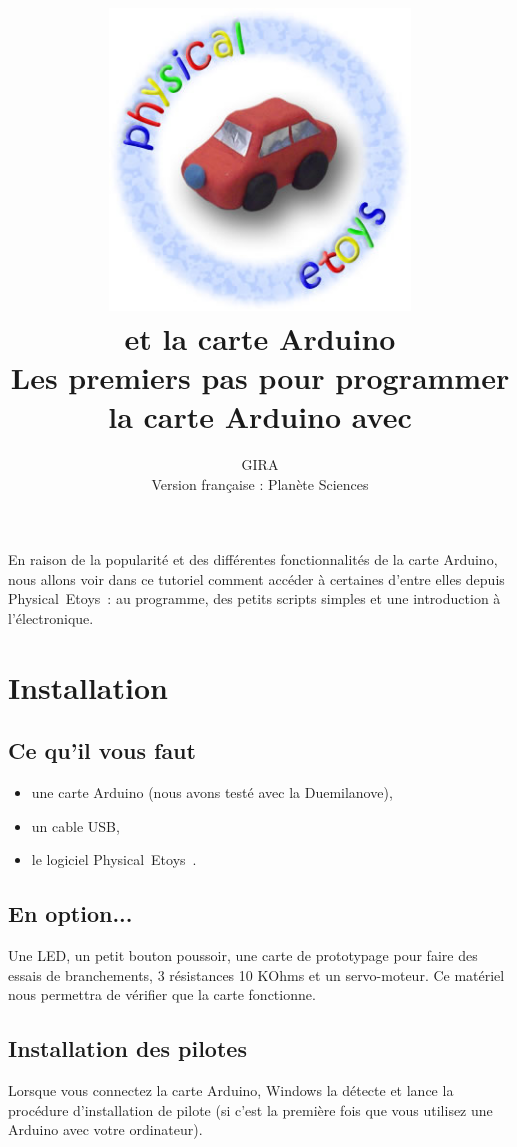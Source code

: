 \documentclass[a4paper,12pt]{article}
\title{
	\includegraphics[width=8cm]{../shared/images/physical_etoys_logo.jpg}\\
	\vfill
	\vspace{3em}
	\LARGE{\textbf{\appName et la carte Arduino}}\\[1cm]
	\large{Les premiers pas pour programmer la carte Arduino avec \appName}\\[1cm]
	\vfill
}
\author{
GIRA \\
Version française : Planète Sciences
}
\def\appName{Physical~Etoys~}
\begin{document}

\maketitle

\cleardoublepage
\tableofcontents
\cleardoublepage

En raison de la popularité et des différentes fonctionnalités de la carte
Arduino, nous allons voir dans ce tutoriel comment accéder à certaines d'entre
elles depuis \appName : au programme, des petits scripts simples et une
introduction à l'électronique.

\section{Installation}

\subsection{Ce qu'il vous faut}

\begin{itemize}
        \item une carte Arduino (nous avons testé avec la Duemilanove),
        \item un cable USB,
        \item le logiciel \appName.
\end{itemize}


\subsection{En option...}

Une LED, un petit bouton poussoir, une carte de prototypage pour faire des
essais de branchements, 3 résistances 10 KOhms et un servo-moteur. Ce matériel
nous permettra de vérifier que la carte fonctionne. 

\subsection{Installation des pilotes}

Lorsque vous connectez la carte Arduino, Windows la détecte et lance la
procédure d'installation de pilote (si c'est la première fois que vous utilisez
une Arduino avec votre ordinateur).
\end{document}

